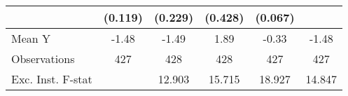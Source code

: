 {\begin{tabular}{l*{5}{c}}
            &     (0.119)         &     (0.229)         &     (0.428)         &     (0.067)         &                     \\
\midrule
Mean Y      &       -1.48         &       -1.49         &        1.89         &       -0.33         &       -1.48         \\
Observations&         427         &         428         &         428         &         427         &         427         \\
Exc. Inst. F-stat&                     &      12.903         &      15.715         &      18.927         &      14.847         \\
\bottomrule
\end{tabular}
}
